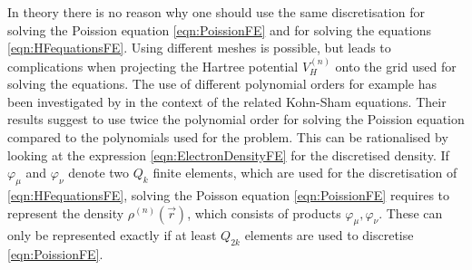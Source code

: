 In theory there is no reason why
one should use the same discretisation
for solving the Poission equation \eqref{eqn:PoissionFE}
and for solving the \HF equations \eqref{eqn:HFequationsFE}.
Using different meshes is possible,
but leads to complications when projecting the Hartree potential $V_H^{(n)}$
onto the grid used for solving the \HF equations.
The use of different polynomial orders for example
has been investigated by \citet{Davydov2015}
in the context of the related Kohn-Sham equations.
Their results suggest to use twice the polynomial order for solving the Poission equation
compared to the polynomials used for the \HF problem.
This can be rationalised by looking at the expression \eqref{eqn:ElectronDensityFE}
for the discretised density.
If $\varphi_\mu$ and $\varphi_\nu$ denote two $Q_k$ finite elements,
which are used for the discretisation of \eqref{eqn:HFequationsFE},
solving the Poisson equation \eqref{eqn:PoissionFE} requires to represent
the density $\rho^{(n)}(\vec{r})$,
which consists of products $\varphi_\mu, \varphi_\nu$.
These can only be represented exactly if at least $Q_{2k}$ elements
are used to discretise \eqref{eqn:PoissionFE}.

%
%

